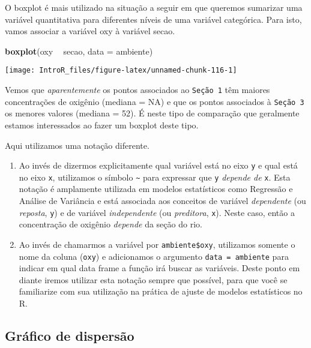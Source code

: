 \documentclass[
]{book}
\newenvironment{Shaded}{\begin{snugshade}}{\end{snugshade}}
\newcommand{\DataTypeTok}[1]{\textcolor[rgb]{0.13,0.29,0.53}{#1}}
\newcommand{\KeywordTok}[1]{\textcolor[rgb]{0.13,0.29,0.53}{\textbf{#1}}}
\newcommand{\NormalTok}[1]{#1}
\newcommand{\OperatorTok}[1]{\textcolor[rgb]{0.81,0.36,0.00}{\textbf{#1}}}
\newcommand{\StringTok}[1]{\textcolor[rgb]{0.31,0.60,0.02}{#1}}
\begin{document}
O boxplot é mais utilizado na situação a seguir em que queremos sumarizar uma variável quantitativa para diferentes níveis de uma variável categórica. Para isto, vamos associar a variável oxy à variável secao.

\begin{Shaded}
\begin{Highlighting}[]
\KeywordTok{boxplot}\NormalTok{(oxy }\OperatorTok{~}\StringTok{ }\NormalTok{secao, }\DataTypeTok{data =}\NormalTok{ ambiente)}
\end{Highlighting}
\end{Shaded}

\begin{center}\texttt{[image: IntroR\_files/figure-latex/unnamed-chunk-116-1]} \end{center}

Vemos que \emph{aparentemente} os pontos associados ao \texttt{Seção\ 1} têm maiores concentrações de oxigênio (mediana = NA) e que os pontos associados à \texttt{Seção\ 3} os menores valores (mediana = 52). É neste tipo de comparação que geralmente estamos interessados ao fazer um boxplot deste tipo.

Aqui utilizamos uma notação diferente.

\begin{enumerate}
\def\labelenumi{\arabic{enumi}.}
\item
  Ao invés de dizermos explicitamente qual variável está no eixo \texttt{y} e qual está no eixo \texttt{x}, utilizamos o símbolo \texttt{\textasciitilde{}} para expressar que \texttt{y} \emph{depende de} \texttt{x}. Esta notação é amplamente utilizada em modelos estatísticos como Regressão e Análise de Variância e está associada aos conceitos de variável \emph{dependente} (ou \emph{reposta}, \texttt{y}) e de variável \emph{independente} (ou \emph{preditora}, \texttt{x}). Neste caso, então a concentração de oxigênio \emph{depende} da seção do rio.
\item
  Ao invés de chamarmos a variável por \texttt{ambiente\$oxy}, utilizamos somente o nome da coluna (\texttt{oxy}) e adicionamos o argumento \texttt{data\ =\ ambiente} para indicar em qual data frame a função irá buscar as variáveis. Deste ponto em diante iremos utilizar esta notação sempre que possível, para que você se familiarize com sua utilização na prática de ajuste de modelos estatísticos no R.
\end{enumerate}

\hypertarget{gruxe1fico-de-dispersuxe3o}{%
\subsection{Gráfico de dispersão}\label{gruxe1fico-de-dispersuxe3o}}
\end{document}
